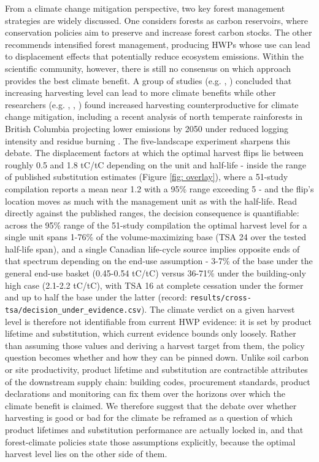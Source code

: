 \documentclass[preprint,12pt,authoryear]{elsarticle}
\begin{document}
\begin{linenumbers}
From a climate change mitigation perspective, two key forest management strategies are widely discussed. One considers forests as carbon reservoirs, where conservation policies aim to preserve and increase forest carbon stocks. The other recommends intensified forest management, producing \acp{HWP} whose use can lead to displacement effects that potentially reduce ecosystem emissions. Within the scientific community, however, there is still no consensus on which approach provides the best climate benefit. A group of studies (e.g. \citep{gustavsson2017climate}, \citep{heinonen2017scenario}) concluded that increasing harvesting level can lead to more climate benefits while other researchers (e.g. \cite{leturcq2020ghg}, \cite{skytt2021climate}, \cite{soimakallio2022closing}) found increased harvesting counterproductive for climate change mitigation, including a recent analysis of north temperate rainforests in British Columbia projecting lower emissions by 2050 under reduced logging intensity and residue burning \citep{dymond2025reducing}. The five-landscape experiment sharpens this debate. The displacement factors at which the optimal harvest flips lie between roughly 0.5 and 1.8 tC/tC depending on the unit and half-life - inside the range of published substitution estimates (Figure \ref{fig: overlay}), where a 51-study compilation \citep{leskinen2018} reports a mean near 1.2 with a 95\% range exceeding 5 - and the flip's location moves as much with the management unit as with the half-life. Read directly against the published ranges, the decision consequence is quantifiable: across the 95\% range of the 51-study compilation the optimal harvest level for a single unit spans 1-76\% of the volume-maximizing base (TSA 24 over the tested half-life span), and a single Canadian life-cycle source \citep{smyth2020climate} implies opposite ends of that spectrum depending on the end-use assumption - 3-7\% of the base under the general end-use basket (0.45-0.54 tC/tC) versus 36-71\% under the building-only high case (2.1-2.2 tC/tC), with TSA 16 at complete cessation under the former and up to half the base under the latter (record: \texttt{results/cross-tsa/decision\_under\_evidence.csv}). The climate verdict on a given harvest level is therefore not identifiable from current \ac{HWP} evidence: it is set by product lifetime and substitution, which current evidence bounds only loosely. Rather than assuming those values and deriving a harvest target from them, the policy question becomes whether and how they can be pinned down. Unlike soil carbon or site productivity, product lifetime and substitution are contractible attributes of the downstream supply chain: building codes, procurement standards, product declarations and monitoring can fix them over the horizons over which the climate benefit is claimed. We therefore suggest that the debate over whether harvesting is good or bad for the climate be reframed as a question of which product lifetimes and substitution performance are actually locked in, and that forest-climate policies state those assumptions explicitly, because the optimal harvest level lies on the other side of them.


\end{linenumbers}
\end{document}
